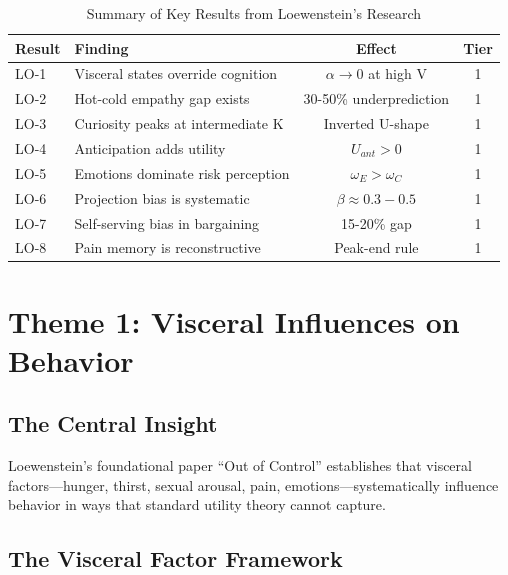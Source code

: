 \begin{table}[htbp]
\centering
\caption{Summary of Key Results from Loewenstein's Research}
\label{tab:lo-key-results}
\renewcommand{\arraystretch}{1.3}
\begin{tabular}{@{}llcc@{}}
\toprule
\textbf{Result} & \textbf{Finding} & \textbf{Effect} & \textbf{Tier} \\
\midrule
LO-1 & Visceral states override cognition & $\alpha \to 0$ at high V & 1 \\
LO-2 & Hot-cold empathy gap exists & 30-50\% underprediction & 1 \\
LO-3 & Curiosity peaks at intermediate K & Inverted U-shape & 1 \\
LO-4 & Anticipation adds utility & $U_{ant} > 0$ & 1 \\
LO-5 & Emotions dominate risk perception & $\omega_E > \omega_C$ & 1 \\
LO-6 & Projection bias is systematic & $\beta \approx 0.3-0.5$ & 1 \\
LO-7 & Self-serving bias in bargaining & 15-20\% gap & 1 \\
LO-8 & Pain memory is reconstructive & Peak-end rule & 1 \\
\bottomrule
\end{tabular}
\end{table}


\section{Theme 1: Visceral Influences on Behavior}
\label{sec:lo-visceral}

\subsection{The Central Insight}

Loewenstein's foundational paper ``Out of Control'' \citep{PAP-loewenstein1996out} establishes that visceral factors---hunger, thirst, sexual arousal, pain, emotions---systematically influence behavior in ways that standard utility theory cannot capture.

\subsection{The Visceral Factor Framework}


